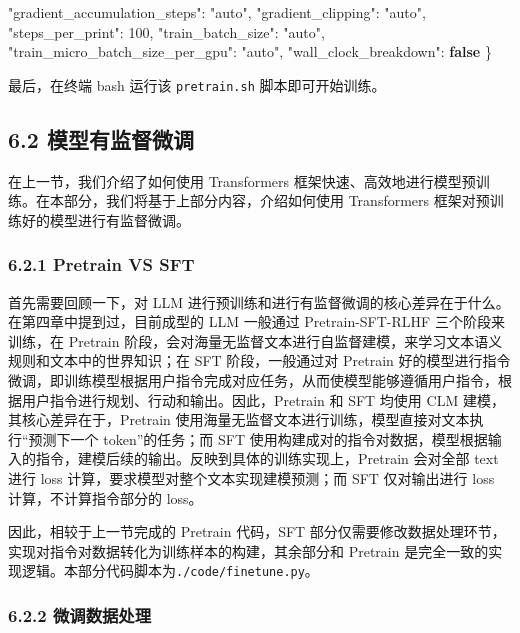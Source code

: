 \documentclass[
]{article}
\newenvironment{Shaded}{}{}
\newcommand{\DataTypeTok}[1]{\textcolor[rgb]{0.56,0.13,0.00}{#1}}
\newcommand{\DecValTok}[1]{\textcolor[rgb]{0.25,0.63,0.44}{#1}}
\newcommand{\FunctionTok}[1]{\textcolor[rgb]{0.02,0.16,0.49}{#1}}
\newcommand{\KeywordTok}[1]{\textcolor[rgb]{0.00,0.44,0.13}{\textbf{#1}}}
\newcommand{\StringTok}[1]{\textcolor[rgb]{0.25,0.44,0.63}{#1}}
\begin{document}
\begin{Shaded}
\begin{Highlighting}[]
    \DataTypeTok{"gradient\_accumulation\_steps"}\FunctionTok{:} \StringTok{"auto"}\FunctionTok{,}
    \DataTypeTok{"gradient\_clipping"}\FunctionTok{:} \StringTok{"auto"}\FunctionTok{,}
    \DataTypeTok{"steps\_per\_print"}\FunctionTok{:} \DecValTok{100}\FunctionTok{,}
    \DataTypeTok{"train\_batch\_size"}\FunctionTok{:} \StringTok{"auto"}\FunctionTok{,}
    \DataTypeTok{"train\_micro\_batch\_size\_per\_gpu"}\FunctionTok{:} \StringTok{"auto"}\FunctionTok{,}
    \DataTypeTok{"wall\_clock\_breakdown"}\FunctionTok{:} \KeywordTok{false}
\FunctionTok{\}}
\end{Highlighting}
\end{Shaded}

最后，在终端 bash 运行该 \texttt{pretrain.sh} 脚本即可开始训练。

\subsection{6.2
模型有监督微调}\label{ux6a21ux578bux6709ux76d1ux7763ux5faeux8c03}

在上一节，我们介绍了如何使用 Transformers
框架快速、高效地进行模型预训练。在本部分，我们将基于上部分内容，介绍如何使用
Transformers 框架对预训练好的模型进行有监督微调。

\subsubsection{6.2.1 Pretrain VS SFT}\label{pretrain-vs-sft}

首先需要回顾一下，对 LLM
进行预训练和进行有监督微调的核心差异在于什么。在第四章中提到过，目前成型的
LLM 一般通过 Pretrain-SFT-RLHF 三个阶段来训练，在 Pretrain
阶段，会对海量无监督文本进行自监督建模，来学习文本语义规则和文本中的世界知识；在
SFT 阶段，一般通过对 Pretrain
好的模型进行指令微调，即训练模型根据用户指令完成对应任务，从而使模型能够遵循用户指令，根据用户指令进行规划、行动和输出。因此，Pretrain
和 SFT 均使用 CLM 建模，其核心差异在于，Pretrain
使用海量无监督文本进行训练，模型直接对文本执行``预测下一个
token''的任务；而 SFT
使用构建成对的指令对数据，模型根据输入的指令，建模后续的输出。反映到具体的训练实现上，Pretrain
会对全部 text 进行 loss 计算，要求模型对整个文本实现建模预测；而 SFT
仅对输出进行 loss 计算，不计算指令部分的 loss。

因此，相较于上一节完成的 Pretrain 代码，SFT
部分仅需要修改数据处理环节，实现对指令对数据转化为训练样本的构建，其余部分和
Pretrain
是完全一致的实现逻辑。本部分代码脚本为\texttt{./code/finetune.py}。

\subsubsection{6.2.2
微调数据处理}\label{ux5faeux8c03ux6570ux636eux5904ux7406}
\end{document}
